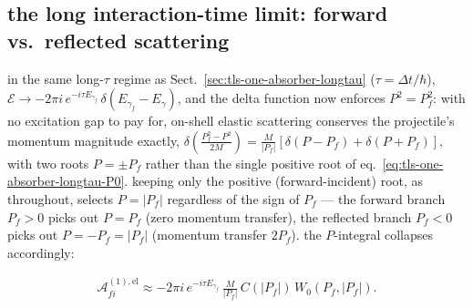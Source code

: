 \subsection{the long interaction-time limit: forward vs.\ reflected scattering}\label{sec:tls-one-absorber-elastic-longtau}
in the same long-$\tau$ regime as Sect.~\ref{sec:tls-one-absorber-longtau} ($\tau=\Delta t/\hbar$), $\mathcal E\to-2\pi i\,e^{-i\tau E_{\gamma_f}}\,\delta(E_{\gamma_f}-E_\gamma)$, and the delta function now enforces $P^2=P_f^2$: with no excitation gap to pay for, on-shell elastic scattering conserves the projectile's momentum magnitude exactly, $\delta\!\left(\frac{P_f^2-P^2}{2M}\right) = \frac M{|P_f|}\left[\delta(P-P_f)+\delta(P+P_f)\right]$, with two roots $P=\pm P_f$ rather than the single positive root of eq.~\eqref{eq:tls-one-absorber-longtau-P0}. keeping only the positive (forward-incident) root, as throughout, selects $P=|P_f|$ regardless of the sign of $P_f$ --- the forward branch $P_f>0$ picks out $P=P_f$ (zero momentum transfer), the reflected branch $P_f<0$ picks out $P=-P_f=|P_f|$ (momentum transfer $2P_f$). the $P$-integral collapses accordingly:
\begin{importantbox}
    \begin{align}
        \mathcal A_{fi}^{(1),\text{el}} \approx -2\pi i\, e^{-i\tau E_{\gamma_f}}\,\frac{M}{|P_f|}\, C(|P_f|)\, W_0(P_f,|P_f|).\label{eq:tls-one-absorber-elastic-longtau-amplitude}
    \end{align}
\end{importantbox}

